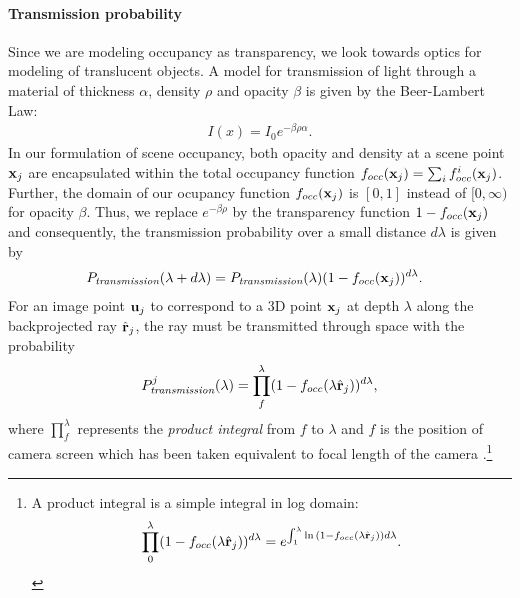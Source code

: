 \paragraph{Transmission probability}
Since we are modeling occupancy as transparency, we look towards optics for modeling of translucent objects. A model for transmission of light through a material of thickness $\alpha$, density $\rho$ and opacity $\beta$ is given by the Beer-Lambert Law:
\begin{align}
I(x) = I_0 e^{-\beta\rho\alpha}.
\end{align}
%
In our formulation of scene occupancy, both opacity and density at a scene point $\mathbf{x}_j$ are encapsulated within the total occupancy function $f_{occ}(\mathbf{x}_j) = \sum_i f^i_{occ}(\mathbf{x}_j)$. Further, the domain of our ocupancy function $f_{occ}(\mathbf{x}_j)$ is $[0, 1]$ instead of $[0, \infty)$ for opacity $\beta$. Thus, we replace $e^{-\beta\rho}$ by the transparency function $1 - f_{occ}(\mathbf{x}_j)$ and consequently, the transmission probability over a small distance $d\lambda$ is given by
%
\begin{align}
  \!\!\!\! P_{\textit{transmission}}(\lambda + d\lambda) = P_{\textit{transmission}}(\lambda) (1-f_{occ}(\mathbf{x}_j))^{d\lambda}.
\end{align}
%
For an image point $\mathbf{u}_j$ to correspond to a 3D point $\mathbf{x}_j$ at depth $\lambda$ along the backprojected ray $\hat{\mathbf{r}}_j$, the ray must be transmitted through space with the probability
\begin{align}
P^j_{\textit{transmission}}(\lambda) = \prod_{f}^{\lambda} (1 - f_{occ}(\lambda \hat{\mathbf{r}}_j))^{d\lambda},
\label{eq:ptrans-integral}
\end{align}
where $\displaystyle\prod_{f}^{\lambda}$ represents the \emph{product integral} from $f$ to $\lambda$ and $f$ is the position of camera screen which has been taken equivalent to focal length of the camera .\footnote{A product integral is a simple integral in log domain: 
\vspace{-0.2cm}
\begin{equation}
\prod_{0}^{\lambda} (1 - f_{occ}(\lambda \hat{\mathbf{r}}_j))^{d\lambda} = e^{\int_{1}^{\lambda} \ln{(1 - f_{occ}(\lambda \hat{\mathbf{r}}_j))}{d\lambda}}. \nonumber
\end{equation}
}

